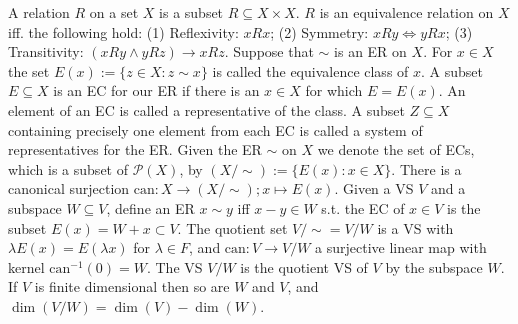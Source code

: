  A relation $R$ on a set $X$ is a subset $R \subseteq X \times X$. $R$ is an equivalence relation on $X$ iff. the following hold:
(1) Reflexivity: $xRx$;
(2) Symmetry: $xRy \Leftrightarrow yRx$;
(3) Transitivity: $(xRy \land yRz) \rightarrow xRz$.
 Suppose that $\sim$ is an ER on $X$. For $x \in X$ the set $E(x) := \{z \in X : z \sim x\}$ is called the equivalence class of $x$. A subset $E \subseteq X$ is an EC for our ER if there is an $x \in X$ for which $E = E(x)$. An element of an EC is called a representative of the class. A subset $Z \subseteq X$ containing precisely one element from each EC is called a system of representatives for the ER.
 Given the ER $\sim$ on $X$ we denote the set of ECs, which is a subset of $\mathcal{P}(X)$, by $(X/\sim) := \{E(x) : x \in X\}$. There is a canonical surjection $\mathrm{can} : X \to (X/\sim); x \mapsto E(x)$.
 Given a VS $V$ and a subspace $W \subseteq V$, define an ER $x \sim y$ iff $x - y \in W$ s.t. the EC of $x \in V$ is the subset $E(x) = W + x \subset V$. The quotient set $V/\sim = V/W$ is a VS with $\lambda E(x) = E(\lambda x)$ for $\lambda \in F$, and $\mathrm{can} : V \to V/W$ a surjective linear map with kernel $\mathrm{can}^{-1}(0) = W$. The VS $V/W$ is the quotient VS of $V$ by the subspace $W$. If $V$ is finite dimensional then so are $W$ and $V$, and $\dim(V/W) = \dim(V) - \dim(W)$.
